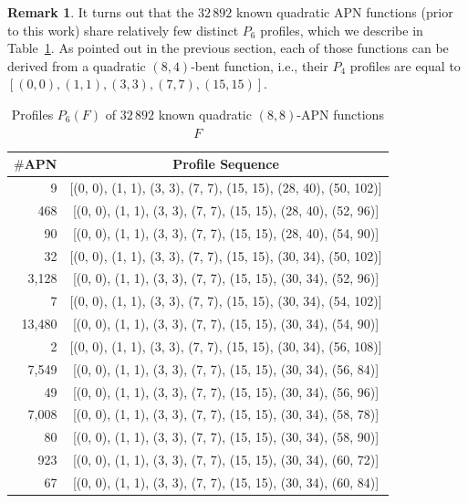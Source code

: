 \documentclass{amsart}[11pt]
\theoremstyle{plain}
\theoremstyle{definition}
\newtheorem{remark}[theorem]{Remark}
\numberwithin{theorem}{section}
\numberwithin{equation}{section}
\numberwithin{table}{section}
\numberwithin{figure}{section}
\numberwithin{algorithm}{section}
\begin{document}
\begin{remark} It turns out that the $32\,892$ known quadratic APN functions (prior to this work) share relatively few distinct $P_6$ profiles, which we describe in Table~\ref{table: profiles}. As pointed out in the previous section, each of those functions can be derived from a quadratic $(8,4)$-bent function, i.e., their $P_4$ profiles are equal to $[(0, 0), (1, 1), (3, 3), (7, 7), (15, 15)]$.
\end{remark}
\begin{table}[h!]
	\centering
	\caption{Profiles $P_6(F)$ of $32\,892$ known quadratic $(8,8)$-APN functions $F$}
	\begin{tabular}{@{}rc@{}} \toprule
		$\#$APN & Profile Sequence \\ \midrule
		9       & [(0, 0), (1, 1), (3, 3), (7, 7), (15, 15), (28, 40), (50,           102)] \\
		468     & [(0, 0), (1, 1), (3, 3), (7, 7), (15, 15), (28, 40), (52, \phantom{1}96)] \\
		90      & [(0, 0), (1, 1), (3, 3), (7, 7), (15, 15), (28, 40), (54, \phantom{1}90)] \\
		32      & [(0, 0), (1, 1), (3, 3), (7, 7), (15, 15), (30, 34), (50,           102)] \\
		3,128   & [(0, 0), (1, 1), (3, 3), (7, 7), (15, 15), (30, 34), (52, \phantom{1}96)] \\ 
		7       & [(0, 0), (1, 1), (3, 3), (7, 7), (15, 15), (30, 34), (54,           102)] \\
		13,480  & [(0, 0), (1, 1), (3, 3), (7, 7), (15, 15), (30, 34), (54, \phantom{1}90)] \\ 
		2       & [(0, 0), (1, 1), (3, 3), (7, 7), (15, 15), (30, 34), (56,           108)] \\
		7,549   & [(0, 0), (1, 1), (3, 3), (7, 7), (15, 15), (30, 34), (56, \phantom{1}84)] \\
		49      & [(0, 0), (1, 1), (3, 3), (7, 7), (15, 15), (30, 34), (56, \phantom{1}96)] \\ 
		7,008   & [(0, 0), (1, 1), (3, 3), (7, 7), (15, 15), (30, 34), (58, \phantom{1}78)] \\
		80      & [(0, 0), (1, 1), (3, 3), (7, 7), (15, 15), (30, 34), (58, \phantom{1}90)] \\ 
		923     & [(0, 0), (1, 1), (3, 3), (7, 7), (15, 15), (30, 34), (60, \phantom{1}72)] \\
		67      & [(0, 0), (1, 1), (3, 3), (7, 7), (15, 15), (30, 34), (60, \phantom{1}84)] \\ \bottomrule
	\end{tabular}
    \label{table: profiles}
\end{table}
\end{document}
